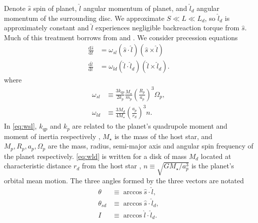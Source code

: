 \documentclass[
        fleqn,
        usenatbib,
    ]{mnras}
\newcommand*{\rd}[2]{\frac{\mathrm{d}#1}{\mathrm{d}#2}}
\newcommand*{\p}[1]{\left(#1\right)}
\begin{document}
Denote $\hat{s}$ spin of planet, $\hat{l}$ angular momentum of planet, and
$\hat{l}_d$ angular momentum of the surrounding disc. We approximate $S \ll L
\ll L_d$, so $\hat{l}_d$ is approximately constant and $\hat{l}$ experiences
negligible backreaction torque from $\hat{s}$. Much of this treatment borrows
from \citealp{anderson2018teeter} and \citealp{millholland_disk}. We consider
precession equations
\begin{align}
    \rd{\hat{s}}{t} &= \omega_{sl} \p{\hat{s} \cdot \hat{l}}
        \p{\hat{s} \times \hat{l}}\label{eq:dsdt}\\
    \rd{\hat{l}}{t} &= \omega_{ld}\p{\hat{l} \cdot \hat{l}_d}
        \p{\hat{l} \times \hat{l}_d}\label{eq:dldt}.
\end{align}
where
\begin{align}
    \omega_{sl} &\equiv \frac{3k_{qp}}{2k_p} \frac{M_\star}{m_p}
        \p{\frac{R_p}{a_p}}^3 \Omega_p,\label{eq:wsl}\\
    \omega_{ld} &\equiv \frac{3M_d}{4M_\star}\p{\frac{a_p}{r_d}}^3 n
        .\label{eq:wld}
\end{align}
In \autoref{eq:wsl}, $k_{qp}$ and $k_p$ are related to the planet's quadrupole
moment and moment of inertia respectively \citep[see][]{lai2018}, $M_\star$ is
the mass of the host star, and $M_p, R_p, a_p, \Omega_p$ are the mass, radius,
semi-major axis and angular spin frequency of the planet respectively.
\autoref{eq:wld} is written for a disk of mass $M_d$ located at characteristic
distance $r_d$ from the host star \citep[see][for a power-law disk
profile]{millholland_disk}, $n \equiv \sqrt{GM_\star/a_p^3}$ is the planet's
orbital mean motion. The three angles formed by the three vectors are notated
\begin{align}
    \theta &\equiv \arccos \hat{s} \cdot \hat{l},\\
    \theta_{sd} &\equiv \arccos \hat{s} \cdot \hat{l}_d,\\
    I &\equiv \arccos \hat{l} \cdot \hat{l}_d.
\end{align}
\end{document}
